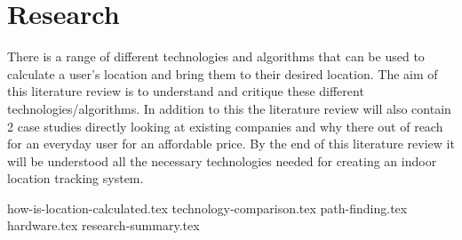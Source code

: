 
\section{Research}
		There is a range of different technologies and algorithms that can be used to calculate a user’s location and bring them to their desired location. The aim of this literature review is to understand and critique these different technologies/algorithms. In addition to this the literature review will also contain 2 case studies directly looking at existing companies and why there out of reach for an everyday user for an affordable price. 
		By the end of this literature review it will be understood all the necessary technologies needed for creating an indoor location tracking system. 
		
		{how-is-location-calculated.tex}
		{technology-comparison.tex}
		{path-finding.tex}
		{hardware.tex}
		{research-summary.tex}
		